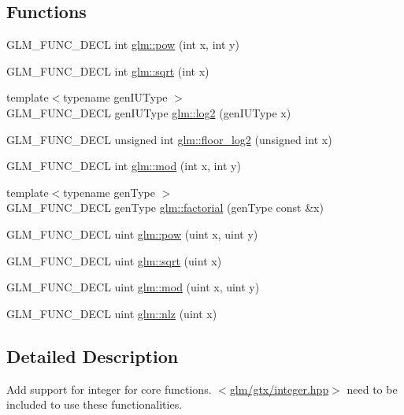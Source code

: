 \subsection*{Functions}
\begin{DoxyCompactItemize}
\item 
G\-L\-M\-\_\-\-F\-U\-N\-C\-\_\-\-D\-E\-C\-L int \hyperlink{group__gtx__integer_ga9642514a44a67afa70966d756f040ca9}{glm\-::pow} (int x, int y)
\item 
G\-L\-M\-\_\-\-F\-U\-N\-C\-\_\-\-D\-E\-C\-L int \hyperlink{group__gtx__integer_ga78e2e68330e91d350fcfc2f4831cad12}{glm\-::sqrt} (int x)
\item 
{\footnotesize template$<$typename gen\-I\-U\-Type $>$ }\\G\-L\-M\-\_\-\-F\-U\-N\-C\-\_\-\-D\-E\-C\-L gen\-I\-U\-Type \hyperlink{group__gtx__integer_ga9bd682e74bfacb005c735305207ec417}{glm\-::log2} (gen\-I\-U\-Type x)
\item 
G\-L\-M\-\_\-\-F\-U\-N\-C\-\_\-\-D\-E\-C\-L unsigned int \hyperlink{group__gtx__integer_ga7011b4e1c1e1ed492149b028feacc00e}{glm\-::floor\-\_\-log2} (unsigned int x)
\item 
G\-L\-M\-\_\-\-F\-U\-N\-C\-\_\-\-D\-E\-C\-L int \hyperlink{group__gtx__integer_gab9d22df91aac4d9eb925a4910f556f1b}{glm\-::mod} (int x, int y)
\item 
{\footnotesize template$<$typename gen\-Type $>$ }\\G\-L\-M\-\_\-\-F\-U\-N\-C\-\_\-\-D\-E\-C\-L gen\-Type \hyperlink{group__gtx__integer_ga8cbd3120905f398ec321b5d1836e08fb}{glm\-::factorial} (gen\-Type const \&x)
\item 
G\-L\-M\-\_\-\-F\-U\-N\-C\-\_\-\-D\-E\-C\-L uint \hyperlink{group__gtx__integer_gaa8229e850c3cc4ad83492fe390ada044}{glm\-::pow} (uint x, uint y)
\item 
G\-L\-M\-\_\-\-F\-U\-N\-C\-\_\-\-D\-E\-C\-L uint \hyperlink{group__gtx__integer_ga457e9efca8339bf918d319e9c55f7c8f}{glm\-::sqrt} (uint x)
\item 
G\-L\-M\-\_\-\-F\-U\-N\-C\-\_\-\-D\-E\-C\-L uint \hyperlink{group__gtx__integer_gab8f9ec0ca93ca90669434224818f0750}{glm\-::mod} (uint x, uint y)
\item 
G\-L\-M\-\_\-\-F\-U\-N\-C\-\_\-\-D\-E\-C\-L uint \hyperlink{group__gtx__integer_gacbe62fd2384464c16ea30ecc4defc11c}{glm\-::nlz} (uint x)
\end{DoxyCompactItemize}


\subsection{Detailed Description}
Add support for integer for core functions. $<$\hyperlink{gtx_2integer_8hpp}{glm/gtx/integer.\-hpp}$>$ need to be included to use these functionalities. 

